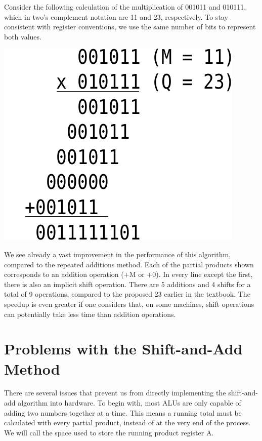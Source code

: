 \documentclass{article}
\begin{document}
Consider the following calculation of the multiplication of 001011 and 010111, which in two's complement notation are 11 and 23, respectively.
To stay consistent with register conventions, we use the same number of bits to represent both values.

\includegraphics[scale=0.5]{saam2.pdf}

We see already a vast improvement in the performance of this algorithm, compared to the repeated additions method.
Each of the partial products shown corresponds to an addition operation (+M or +0).
In every line except the first, there is also an implicit shift operation.
There are 5 additions and 4 shifts for a total of 9 operations, compared to the proposed 23 earlier in the textbook.
The speedup is even greater if one considers that, on some machines, shift operations can potentially take less time than addition operations.

\section{Problems with the Shift-and-Add Method}
There are several issues that prevent us from directly implementing the shift-and-add algorithm into hardware.
To begin with, most ALUs are only capable of adding two numbers together at a time.
This means a running total must be calculated with every partial product, instead of at the very end of the process.
We will call the space used to store the running product register A.
\end{document}
